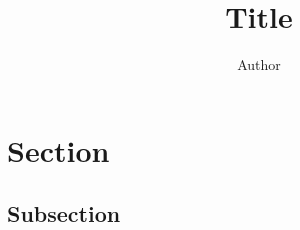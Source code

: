 \documentclass[12pt]{article}
\title{Title}
\author{Author}
\begin{document}
\maketitle

\section{Section}
\subsection{Subsection}

\lipsum
\end{document}
